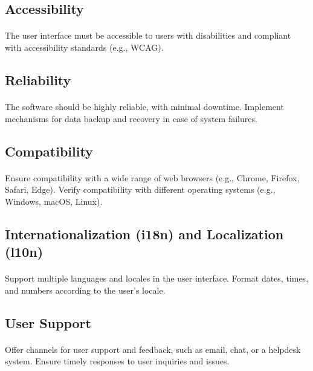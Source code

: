 \documentclass{article}
\begin{document}
\subsection{Accessibility}
\paragraph{}
The user interface must be accessible to users with disabilities and compliant with accessibility standards (e.g., WCAG).

\subsection{Reliability}
\paragraph{}
The software should be highly reliable, with minimal downtime.
Implement mechanisms for data backup and recovery in case of system failures.

\subsection{Compatibility}
\paragraph{}
Ensure compatibility with a wide range of web browsers (e.g., Chrome, Firefox, Safari, Edge).
Verify compatibility with different operating systems (e.g., Windows, macOS, Linux).

\subsection{Internationalization (i18n) and Localization (l10n)}
\paragraph{}
Support multiple languages and locales in the user interface.
Format dates, times, and numbers according to the user's locale.

\subsection{User Support}
\paragraph{}
Offer channels for user support and feedback, such as email, chat, or a helpdesk system.
Ensure timely responses to user inquiries and issues.
\end{document}
